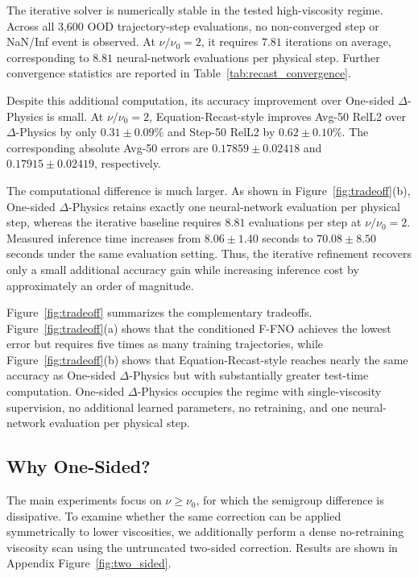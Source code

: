 \documentclass[10pt,twocolumn]{article}
\begin{document}
The iterative solver is numerically stable in the tested high-viscosity
regime. Across all 3,600 OOD trajectory-step evaluations, no non-converged
step or NaN/Inf event is observed. At $\nu/\nu_0=2$, it requires
$7.81$ iterations on average, corresponding to $8.81$ neural-network
evaluations per physical step. Further convergence statistics are reported in
Table~\ref{tab:recast_convergence}.

Despite this additional computation, its accuracy improvement over
One-sided $\Delta$-Physics is small. At $\nu/\nu_0=2$, Equation-Recast-style
improves Avg-50 RelL2 over $\Delta$-Physics by only
$0.31\pm0.09\%$ and Step-50 RelL2 by
$0.62\pm0.10\%$. The corresponding absolute Avg-50 errors are
$0.17859\pm0.02418$ and $0.17915\pm0.02419$, respectively.

The computational difference is much larger. As shown in
Figure~\ref{fig:tradeoff}(b), One-sided $\Delta$-Physics retains exactly one
neural-network evaluation per physical step, whereas the iterative baseline
requires $8.81$ evaluations per step at $\nu/\nu_0=2$. Measured inference
time increases from $8.06\pm1.40$ seconds to
$70.08\pm8.50$ seconds under the same evaluation setting.
Thus, the iterative refinement recovers only a small additional accuracy gain
while increasing inference cost by approximately an order of magnitude.

Figure~\ref{fig:tradeoff} summarizes the complementary tradeoffs.
Figure~\ref{fig:tradeoff}(a) shows that the conditioned F-FNO achieves the
lowest error but requires five times as many training trajectories, while
Figure~\ref{fig:tradeoff}(b) shows that Equation-Recast-style reaches nearly
the same accuracy as One-sided $\Delta$-Physics but with substantially greater
test-time computation. One-sided $\Delta$-Physics occupies the regime with
single-viscosity supervision, no additional learned parameters, no
retraining, and one neural-network evaluation per physical step.

\subsection{Why One-Sided?}
\label{sec:onesided_ablation}

The main experiments focus on $\nu\ge\nu_0$, for which the semigroup
difference is dissipative. To examine whether the same correction can be
applied symmetrically to lower viscosities, we additionally perform a dense
no-retraining viscosity scan using the untruncated two-sided correction.
Results are shown in Appendix Figure~\ref{fig:two_sided}.
\end{document}
